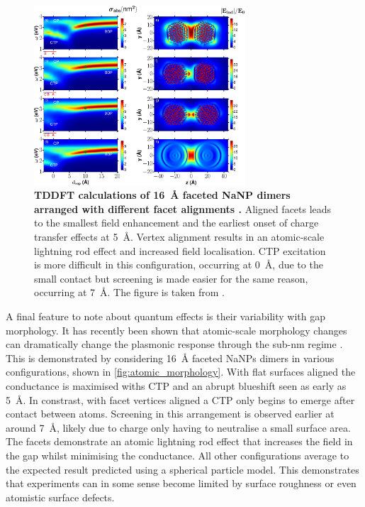 \documentclass{article}
\begin{document}
\begin{figure}[bt]
\centering
\includegraphics[width=0.7\textwidth]{figures/literature/nl-2015-007593_0001}
\caption[TDDFT calculations of \SI{16}{\angstrom} faceted NaNP dimers arranged with different facet alignments \cite{barbry2015}]{\textbf{TDDFT calculations of \SI{16}{\angstrom} faceted NaNP dimers arranged with different facet alignments \cite{barbry2015}.} Aligned facets leads to the smallest field enhancement and the earliest onset of charge transfer effects at \SI{5}{\angstrom}. Vertex alignment results in an atomic-scale lightning rod effect and increased field localisation. CTP excitation is more difficult in this configuration, occurring at \SI{0}{\angstrom}, due to the small contact but screening is made easier for the same reason, occurring at \SI{7}{\angstrom}. The figure is taken from \cite{barbry2015}.}
\label{fig:atomic_morphology}
\end{figure}

A final feature to note about quantum effects is their variability with gap morphology. It has recently been shown that atomic-scale morphology changes can dramatically change the plasmonic response through the sub-nm regime \cite{barbry2015}. This is demonstrated by considering \SI{16}{\angstrom} faceted NaNPs dimers in various configurations, shown in \autoref{fig:atomic_morphology}. With flat surfaces aligned the conductance is maximised withs CTP and an abrupt blueshift seen as early as \SI{5}{\angstrom}. In constrast, with facet vertices aligned a CTP only begins to emerge after contact between atoms. Screening in this arrangement is observed earlier at around \SI{7}{\angstrom}, likely due to charge only having to neutralise a small surface area. The facets demonstrate an atomic lightning rod effect that increases the field in the gap whilst minimising the conductance. All other configurations average to the expected result predicted using a spherical particle model. This demonstrates that experiments can in some sense become limited by surface roughness or even atomistic surface defects.
\end{document}
